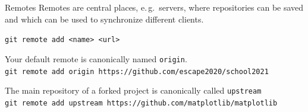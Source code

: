 \begin{frame}{Remotes}
  Remotes are central places, e.\,g.\ servers, where repositories can be saved and which can be used to synchronize different clients.
  \begin{center}
  \end{center}

  \texttt{git remote add <name> <url>}

  Your default remote is canonically named \texttt{origin}. \\
  \texttt{\small git remote add origin https://github.com/escape2020/school2021}

  The main repository of a forked project is canonically called \texttt{upstream}\\
  \texttt{\small git remote add upstream https://github.com/matplotlib/matplotlib}
\end{frame}

